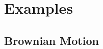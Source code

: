 \documentclass{article}
\theoremstyle{definition}
\begin{document}
\section{Examples}

\subsection{Brownian Motion}
\end{document}
